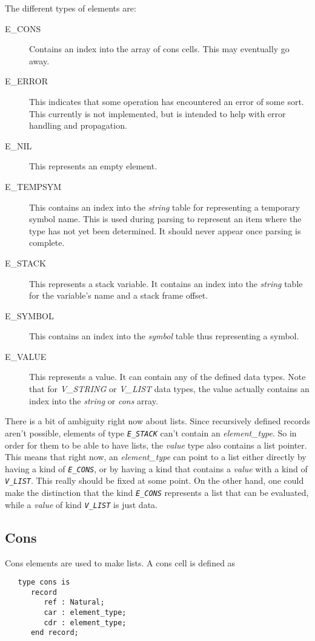 \documentclass[10pt, openany]{book}
\newcommand{\constant}[1]{\emph{\texttt{#1}}}
\begin{document}
The different types of elements are:
\begin{description}
  \item[E\_CONS] Contains an index into the array of cons cells.  This may eventually go away.
  \item[E\_ERROR]  This indicates that some operation has encountered an error of some sort.  This currently is not implemented, but is intended to help with error handling and propagation.
  \item[E\_NIL] This represents an empty element.
  \item[E\_TEMPSYM] This contains an index into the \emph{string} table for representing a temporary symbol name.  This is used during parsing to represent an item where the type has not yet been determined.  It should never appear once parsing is complete.
  \item[E\_STACK] This represents a stack variable.  It contains an index into the \emph{string} table for the variable's name and a stack frame offset.
  \item[E\_SYMBOL] This contains an index into the \emph{symbol} table thus representing a symbol.
  \item[E\_VALUE] This represents a value.  It can contain any of the defined data types.  Note that for \emph{V\_STRING} or \emph{V\_LIST} data types, the value actually contains an index into the \emph{string} or \emph{cons} array.
\end{description}

There is a bit of ambiguity right now about lists.  Since recursively defined records aren't possible, elements of type  \constant{E\_STACK} can't contain an \emph{element\_type}.  So in order for them to be able to have lists, the \emph{value} type also contains a list pointer.  This means that right now, an \emph{element\_type} can point to a list either directly by having a kind of \constant{E\_CONS}, or by having a kind that contains a \emph{value} with a kind of \constant{V\_LIST}.  This really should be fixed at some point.  On the other hand, one could make the distinction that the kind \constant{E\_CONS} represents a list that can be evaluated, while a \emph{value} of kind \constant{V\_LIST} is just data.

\subsection{Cons}
Cons elements are used to make lists.  A cons cell is defined as
\begin{lstlisting}
   type cons is
      record
         ref : Natural;
         car : element_type;
         cdr : element_type;
      end record;
\end{lstlisting}
\end{document}

